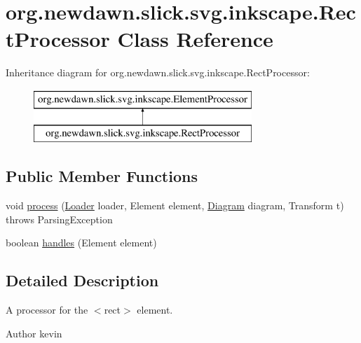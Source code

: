 \hypertarget{classorg_1_1newdawn_1_1slick_1_1svg_1_1inkscape_1_1_rect_processor}{}\section{org.\+newdawn.\+slick.\+svg.\+inkscape.\+Rect\+Processor Class Reference}
\label{classorg_1_1newdawn_1_1slick_1_1svg_1_1inkscape_1_1_rect_processor}
Inheritance diagram for org.\+newdawn.\+slick.\+svg.\+inkscape.\+Rect\+Processor\+:\begin{figure}[H]
\begin{center}
\leavevmode
\includegraphics[height=2.000000cm]{classorg_1_1newdawn_1_1slick_1_1svg_1_1inkscape_1_1_rect_processor}
\end{center}
\end{figure}
\subsection*{Public Member Functions}
\begin{DoxyCompactItemize}
\item 
void \mbox{\hyperlink{classorg_1_1newdawn_1_1slick_1_1svg_1_1inkscape_1_1_rect_processor_ab411c9f69524536d7b05ab0e7ea3e69e}{process}} (\mbox{\hyperlink{interfaceorg_1_1newdawn_1_1slick_1_1svg_1_1_loader}{Loader}} loader, Element element, \mbox{\hyperlink{classorg_1_1newdawn_1_1slick_1_1svg_1_1_diagram}{Diagram}} diagram, Transform t)  throws Parsing\+Exception 
\item 
boolean \mbox{\hyperlink{classorg_1_1newdawn_1_1slick_1_1svg_1_1inkscape_1_1_rect_processor_a8558ba7a28daef670cedb8afe8d68286}{handles}} (Element element)
\end{DoxyCompactItemize}


\subsection{Detailed Description}
A processor for the $<$rect$>$ element.

\begin{DoxyAuthor}{Author}
kevin 
\end{DoxyAuthor}


